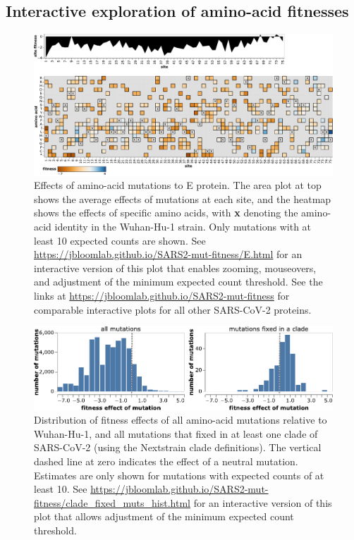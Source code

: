 \documentclass[9pt,twocolumn,twoside]{gsajnl_modified}
\begin{document}
\subsection*{Interactive exploration of amino-acid fitnesses}

\begin{figure}
\includegraphics[width=\linewidth]{figs/E_heatmap.pdf}
\caption{
Effects of amino-acid mutations to E protein.
The area plot at top shows the average effects of mutations at each site, and the heatmap shows the effects of specific amino acids, with \textbf{x} denoting the amino-acid identity in the Wuhan-Hu-1 strain.
Only mutations with at least 10 expected counts are shown.
See \url{https://jbloomlab.github.io/SARS2-mut-fitness/E.html} for an interactive version of this plot that enables zooming, mouseovers, and adjustment of the minimum expected count threshold.
See the links at \url{https://jbloomlab.github.io/SARS2-mut-fitness} for comparable interactive plots for all other SARS-CoV-2 proteins.
\label{fig:E_heatmap}
}
\end{figure}

\begin{figure}
\centering
\includegraphics[width=0.7\linewidth]{figs/fixed_dist.pdf}
\caption{
Distribution of fitness effects of all amino-acid mutations relative to Wuhan-Hu-1, and all mutations that fixed in at least one clade of SARS-CoV-2 (using the Nextstrain clade definitions).
The vertical dashed line at zero indicates the effect of a neutral mutation.
Estimates are only shown for mutations with expected counts of at least 10.
See \url{https://jbloomlab.github.io/SARS2-mut-fitness/clade_fixed_muts_hist.html} for an interactive version of this plot that allows adjustment of the minimum expected count threshold.
\label{fig:fixed_dist}
}
\end{figure}
\end{document}
